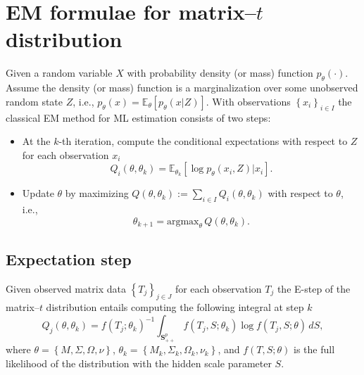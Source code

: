 \documentclass[english,listof=totoc]{scrartcl}
\begin{document}
\section{EM formulae for matrix--$t$ distribution}\label{sec:EM}

Given a random variable $X$ with probability density (or mass) function $p_{\theta}(\cdot)$. Assume the density (or mass) function is a marginalization over some unobserved random state $Z$, i.e., $p_{\theta}(x)=\mathbb{E}_{\theta}\left[p_{\theta}(x|Z)\right]$. With observations $\left\{x_i\right\}_{i\in I}$ the classical EM method for ML estimation consists of two steps:

\begin{itemize}
\item At the $k$-th iteration, compute the conditional expectations with respect to $Z$ for each observation $x_i$
\begin{equation}
Q_i(\theta,\theta_k)=\mathbb{E}_{\theta_k}\left[\log p_{\theta}(x_i,Z)|x_i\right].
\end{equation}

\item Update $\theta$ by maximizing $Q(\theta,\theta_k):=\sum_{i\in I}Q_i(\theta,\theta_k)$ with respect to $\theta$, i.e.,
\begin{equation}
\theta_{k+1} = \textrm{argmax}_{\theta}\,Q(\theta,\theta_k).
\end{equation}
\end{itemize}

\subsection{Expectation step}

Given observed matrix data $\left\{T_j\right\}_{j\in J}$ for each observation $T_j$ the E-step of the matrix--$t$ distribution entails computing the following integral at step $k$
\begin{equation}
Q_j(\theta,\theta_k)=f(T_j;\theta_k)^{-1}\int_{\mathbf{S}_{++}^p}f(T_{j},S;\theta_k)\log f\left(T_{j},S;\theta\right)\,dS,\label{eq:expdef}
\end{equation}
where $\theta=\left\{M,\Sigma,\Omega,\nu\right\}$, $\theta_k=\left\{M_k,\Sigma_k,\Omega_k,\nu_k\right\}$, and $f(T,S;\theta)$ is the full likelihood of the distribution with the hidden scale parameter $S$.
\end{document}
